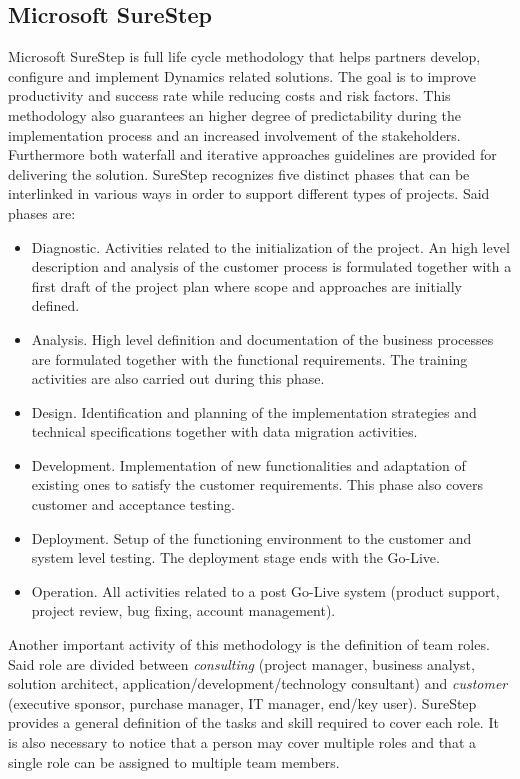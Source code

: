 \subsection{Microsoft SureStep}

Microsoft SureStep \cite{SureStepBook} is full life cycle methodology that helps partners develop, configure and implement Dynamics related solutions. The goal is to improve productivity and success rate while reducing costs and risk factors. This methodology also guarantees an higher degree of predictability during the implementation process and an increased involvement of the stakeholders. Furthermore both waterfall and iterative approaches guidelines are provided for delivering the solution. SureStep recognizes five distinct phases that can be interlinked in various ways in order to support different types of projects. Said phases are: 

\begin{itemize}
    \item Diagnostic. Activities related to the initialization of the project. An high level description and analysis of the customer process is formulated together with a first draft of the project plan where scope and approaches are initially defined. 
    \item Analysis. High level definition and documentation of the business processes are formulated together with the functional requirements. The training activities are also carried out during this phase.
    \item Design. Identification and planning of the implementation strategies and technical specifications together with data migration activities.
    \item Development. Implementation of new functionalities and adaptation of existing ones to satisfy the customer requirements. This phase also covers customer and acceptance testing. 
    \item Deployment. Setup of the functioning environment to the customer and system level testing. The deployment stage ends with the Go-Live.
    \item Operation. All activities related to a post Go-Live system (product support, project review, bug fixing, account management).
\end{itemize}

Another important activity of this methodology is the definition of team roles. Said role are divided between \textit{consulting} (project manager, business analyst, solution architect, application/development/technology consultant) and \textit{customer} (executive sponsor, purchase manager, IT manager, end/key user). SureStep provides a general definition of the tasks and skill required to cover each role. It is also necessary to notice that a person may cover multiple roles and that a single role can be assigned to multiple team members. 

